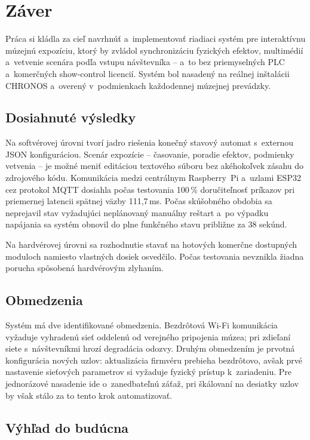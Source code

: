 \chapter{Záver}
\label{Zaver}

Práca si kládla za cieľ navrhnúť a~implementovať riadiaci systém
pre interaktívnu múzejnú expozíciu, ktorý by zvládol synchronizáciu
fyzických efektov, multimédií a~vetvenie scenára podľa vstupu
návštevníka -- a~to bez priemyselných PLC a~komerčných show-control
licencií. Systém bol nasadený na reálnej inštalácii CHRONOS
a~overený v~podmienkach každodennej múzejnej prevádzky.

\section*{Dosiahnuté výsledky}

Na softvérovej úrovni tvorí jadro riešenia konečný stavový automat
s~externou JSON konfiguráciou. Scenár expozície -- časovanie, poradie
efektov, podmienky vetvenia -- je možné meniť editáciou textového
súboru bez akéhokoľvek zásahu do zdrojového kódu. Komunikácia medzi centrálnym Raspberry~Pi a~uzlami ESP32
cez protokol MQTT dosiahla počas testovania 100\,\% doručiteľnosť
príkazov pri priemernej latencii spätnej väzby 111{,}7\,ms.
Počas skúšobného obdobia sa neprejavil stav vyžadujúci neplánovaný
manuálny reštart a~po výpadku napájania sa systém obnovil do plne
funkčného stavu približne za 38 sekúnd.

Na hardvérovej úrovni sa rozhodnutie stavať na hotových
komerčne dostupných moduloch namiesto vlastných dosiek osvedčilo.
Počas testovania nevznikla žiadna porucha spôsobená hardvérovým
zlyhaním.

\section*{Obmedzenia}

Systém má dve identifikované obmedzenia. Bezdrôtová Wi-Fi komunikácia
vyžaduje vyhradenú sieť oddelenú od verejného pripojenia múzea;
pri zdieľaní siete s~návštevníkmi hrozí degradácia odozvy. Druhým
obmedzením je prvotná konfigurácia nových uzlov: aktualizácia
firmvéru prebieha bezdrôtovo, avšak prvé nastavenie sieťových
parametrov si vyžaduje fyzický prístup k~zariadeniu. Pre jednorázové
nasadenie ide o~zanedbateľnú záťaž, pri škálovaní na desiatky
uzlov by však stálo za to tento krok automatizovať.

\section*{Výhľad do budúcna}

